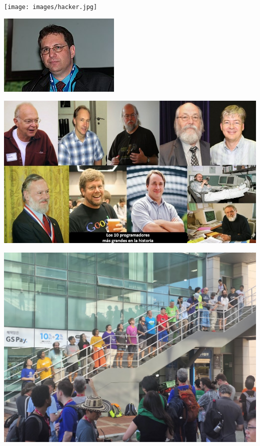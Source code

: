\documentclass{beamer}
\begin{document}

\begin{frame}
		\texttt{[image: images/hacker.jpg]}
\end{frame}

\begin{frame}
		\includegraphics[width=0.7\linewidth]{images/mitnik.jpg}
\end{frame}

\begin{frame}
		\includegraphics[width=0.7\linewidth]{images/coders.jpg}
\end{frame}

\begin{frame}
		\includegraphics[width=0.7\linewidth]{images/comunidad.jpg}
\end{frame}
\end{document}

